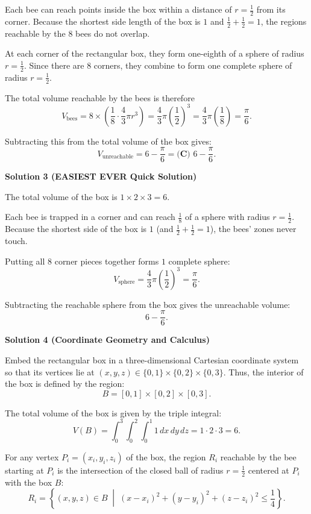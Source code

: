 \begin{enumerate}
 Each bee can reach points inside the box within a distance of $r = \frac{1}{2}$ from its corner. Because the shortest side length of the box is $1$ and $\frac{1}{2} + \frac{1}{2} = 1$, the regions reachable by the $8$ bees do not overlap.

 At each corner of the rectangular box, they form one-eighth of a sphere of radius $r = \frac{1}{2}$. Since there are $8$ corners, they combine to form one complete sphere of radius $r = \frac{1}{2}$.

 The total volume reachable by the bees is therefore
 \[V_{\text{bees}} = 8 \times \left(\frac{1}{8} \cdot \frac{4}{3}\pi r^3\right) = \frac{4}{3}\pi \left(\frac{1}{2}\right)^3 = \frac{4}{3}\pi \left(\frac{1}{8}\right) = \frac{\pi}{6}.\]

 Subtracting this from the total volume of the box gives:
 \[V_{\text{unreachable}} = 6 - \frac{\pi}{6} = \boxed{\textbf{(C) } 6 - \frac{\pi}{6}}.\]




\textbf{Solution 3 (EASIEST EVER Quick Solution)}

The total volume of the box is $1 \times 2 \times 3 = 6$.

 Each bee is trapped in a corner and can reach $\frac{1}{8}$ of a sphere with radius $r = \frac{1}{2}$. Because the shortest side of the box is $1$ (and $\frac{1}{2} + \frac{1}{2} = 1$), the bees' zones never touch. 

 Putting all $8$ corner pieces together forms $1$ complete sphere:
 \[V_{\text{sphere}} = \frac{4}{3}\pi \left(\frac{1}{2}\right)^3 = \frac{\pi}{6}.\]

 Subtracting the reachable sphere from the box gives the unreachable volume:
 \[6 - \frac{\pi}{6}.\]




\textbf{Solution 4 (Coordinate Geometry and Calculus)}

Embed the rectangular box in a three-dimensional Cartesian coordinate system so that its vertices lie at $(x, y, z) \in \{0, 1\} \times \{0, 2\} \times \{0, 3\}$. Thus, the interior of the box is defined by the region:
 \[B = [0,1] \times [0,2] \times [0,3].\]

 The total volume of the box is given by the triple integral:
 \[V(B) = \int_0^3 \int_0^2 \int_0^1 1 \, dx \, dy \, dz = 1 \cdot 2 \cdot 3 = 6.\]

 For any vertex $P_i = (x_i, y_i, z_i)$ of the box, the region $R_i$ reachable by the bee starting at $P_i$ is the intersection of the closed ball of radius $r = \frac{1}{2}$ centered at $P_i$ with the box $B$:
 \[R_i = \left\{ (x, y, z) \in B \;\middle|\; (x - x_i)^2 + (y - y_i)^2 + (z - z_i)^2 \leq \frac{1}{4} \right\}.\]


\end{enumerate}
